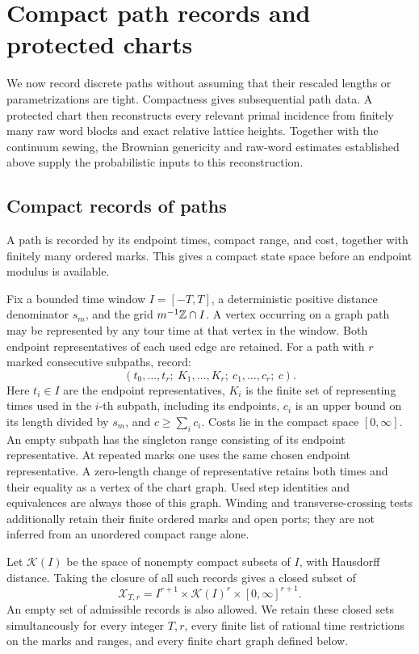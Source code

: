 \section{Compact path records and protected charts}
\label{sec:protected-charts}

We now record discrete paths without assuming that their rescaled lengths
or parametrizations are tight. Compactness gives subsequential path data.
A protected chart then reconstructs every relevant primal incidence from
finitely many raw word blocks and exact relative lattice heights. Together with the
continuum sewing, the Brownian genericity and raw-word estimates
established above supply the probabilistic inputs to this reconstruction.

\subsection{Compact records of paths}

A path is recorded by its endpoint times, compact range, and cost, together with finitely many ordered marks. This gives a compact state space before an endpoint modulus is available.

Fix a bounded time window \(I=[-T,T]\), a deterministic positive distance denominator \(s_m\), and the grid \(m^{-1}\mathbb Z\cap I\). A vertex occurring on a graph path may be represented by any tour time at that vertex in the window. Both endpoint representatives of each used edge are retained. For a path with \(r\) marked consecutive subpaths, record:
\[
 (t_0,\ldots,t_r;\ K_1,\ldots,K_r;\ c_1,\ldots,c_r;\ c).
\]
Here \(t_i\in I\) are the endpoint representatives, \(K_i\) is the finite set of representing times used in the \(i\)-th subpath, including its endpoints, \(c_i\) is an upper bound on its length divided by \(s_m\), and \(c\ge\sum_i c_i\). Costs lie in the compact space \([0,\infty]\). An empty subpath has the singleton range consisting of its endpoint representative. At repeated marks one uses the same chosen endpoint representative. A zero-length change of representative retains both times and their equality as a vertex of the chart graph. Used step identities and equivalences are always those of this graph. Winding and transverse-crossing tests additionally retain their finite ordered marks and open ports; they are not inferred from an unordered compact range alone.

Let \(\mathcal K(I)\) be the space of nonempty compact subsets of \(I\), with Hausdorff distance. Taking the closure of all such records gives a closed subset of
\[
 \mathcal X_{T,r}
 =I^{r+1}\times\mathcal K(I)^r\times[0,\infty]^{r+1}.
\]
An empty set of admissible records is also allowed. We retain these closed sets simultaneously for every integer \(T,r\), every finite list of rational time restrictions on the marks and ranges, and every finite chart graph defined below.

